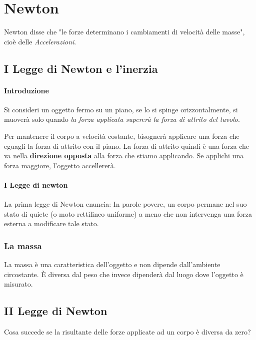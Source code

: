 \documentclass[12pt, a4paper, openany]{book}
\begin{document}
\section{Newton}
Newton disse che "le forze determinano i cambiamenti di velocità delle masse", cioè delle \emph{Accelerazioni}.
\subsection{I Legge di Newton e l'inerzia}
\paragraph*{Introduzione}
Si consideri un oggetto fermo su un piano, se lo si spinge orizzontalmente, si muoverà solo quando \emph{la forza applicata supererà la forza di attrito del tavolo}.

Per mantenere il corpo a velocità costante, bisognerà applicare una forza che eguagli la forza di attrito con il piano.
La forza di attrito quindi è una forza che va nella \textbf{direzione opposta} alla forza che stiamo applicando.
Se applichi una forza maggiore, l'oggetto accellererà.

\paragraph{I Legge di newton}
La prima legge di Newton enuncia:
In parole povere, un corpo permane nel suo stato di quiete (o moto rettilineo uniforme) a meno che non intervenga una forza esterna a modificare tale stato.

\subsubsection*{La massa}
La massa è una caratteristica dell'oggetto e non dipende dall'ambiente circostante.
È diversa dal peso che invece dipenderà dal luogo dove l'oggetto è misurato.

\subsection{II Legge di Newton}
Cosa succede se la risultante delle forze applicate ad un corpo è diversa da zero?
\end{document}
